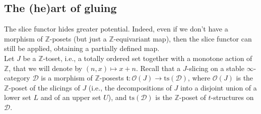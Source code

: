 \documentclass{article}
\theoremstyle{definition}
\newcommand{\Z}{\mathbb{Z}}
\newcommand{\Oo}{\mathcal{O}}
\newcommand{\ts}{\mathrm{ts}}
\newcommand{\tee}{\mathfrak{t}}
\begin{document}
\begin{titlepage}
\end{titlepage}



\subsection{The (he)art of gluing} The slice functor hides greater potential. Indeed, even if we don't have a morphism of $\mathbb{Z}$-posets (but just a $\mathbb{Z}$-equivariant map), then the slice functor can still be applied, obtaining a partially defined map. \\

Let $J$ be a $\Z$-toset, i.e., a totally ordered set together with a monotone action of $\Z$, that we will denote by $(n,x)\mapsto x+n$. Recall that a $J$-slicing on a stable $\infty$-category $\mathscr{D}$ is a morphism of $\Z$-posests $\tee\colon \Oo(J)\to \ts(\mathscr{D})$, where $\Oo(J)$ is the $\Z$-poset of the slicings of $J$ (i.e., the decompositions of $J$ into a disjoint union of a lower set $L$ and of an upper set $U$), and $\ts(\mathscr{D})$ is the $\Z$-poset of $t$-structures on $\mathscr{D}$.
\end{document}
